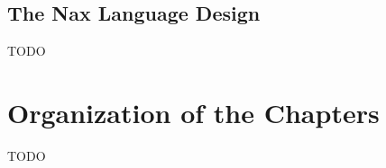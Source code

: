 \subsection{The Nax Language Design}
TODO

\section{Organization of the Chapters}\label{sec:intro:org}
TODO

\begin{comment}
In my dissertation, I will contribute to answering the question
``how does one build a seamless system where programmers
can both write (functional) programs
and formally reason about those programs.''
I will introduce the motivation for pursuing such a system
in \S\ref{sec:motiv},
and I will also discuss foundational work upon which
the approach developed in my thesis is based.


\section{Motivation} \label{sec:motiv}

\section{Thesis}
In my dissertation, I will contribute to answering the question
``how does one build a seamless system where programmers
can both write (functional) programs
and formally reason about those programs.'' In Chapter \ref{ch:relwork},
I will introduce the motivation for pursuing such a system.
I will discuss other approaches to building such a system,
and I will also discuss foundational work upon which
the approach developed in my thesis is based.
The following is my thesis statement, which summarizes my
approach:
\begin{quote}
A language equipped with \emph{term indexed types} and
\emph{Mendler-style recursion combinators} can be 
(1) a basis for \emph{sound and consistent logic}
suitable for reasoning about properties of (functional) programs
and also
(2) a basis for a \emph{simple and expressive programming language}
suitable for writing the (functional) programs to be reasoned about.
\end{quote}

I believe such an approach is promising because, under the design I will
promote, both the logic and the programming language share many
common features. Amongst those features are the two design concepts
of indexed types and Mendler-style recursion combinators.


\end{comment}
